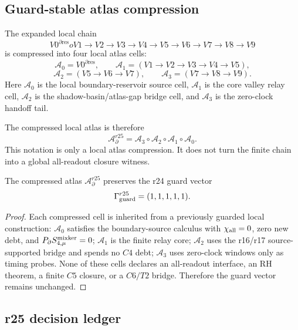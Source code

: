 \subsection{Guard-stable atlas compression}
\label{subsec:v470-r25-guard-stable-atlas-compression}

The expanded local chain
\[
V0^{\partial\mathrm{res}}	o V1\to V2\to V3\to V4\to V5\to V6\to V7\to V8\to V9
\]
is compressed into four local atlas cells:
\[
\mathcal A_0=V0^{\partial\mathrm{res}},
\qquad
\mathcal A_1=(V1\to V2\to V3\to V4\to V5),
\]
\[
\mathcal A_2=(V5\to V6\to V7),
\qquad
\mathcal A_3=(V7\to V8\to V9).
\]
Here \(\mathcal A_0\) is the local boundary-reservoir source cell,
\(\mathcal A_1\) is the core valley relay cell, \(\mathcal A_2\) is the
shadow-basin/atlas-gap bridge cell, and \(\mathcal A_3\) is the zero-clock
handoff tail.

The compressed local atlas is therefore
\[
\boxed{
\mathcal A_{\partial}^{r25}
=
\mathcal A_3\circ\mathcal A_2\circ\mathcal A_1\circ\mathcal A_0.
}
\]
This notation is only a local atlas compression.  It does not turn the finite
chain into a global all-readout closure witness.

\begin{lemma}
\label{lem:v470-r25-guard-stable-compression}
The compressed atlas \(\mathcal A_{\partial}^{r25}\) preserves the r24 guard
vector
\[
\Gamma_{\rm guard}^{r25}=(1,1,1,1,1).
\]
\end{lemma}

\begin{proof}
Each compressed cell is inherited from a previously guarded local construction:
\(\mathcal A_0\) satisfies the boundary-source calculus with
\(\chi_{\rm all}=0\), zero new debt, and \(P_{\partial}S_{4,\mu}^{\rm mixker}=0\);
\(\mathcal A_1\) is the finite relay core; \(\mathcal A_2\) uses the r16/r17
source-supported bridge and spends no \(C4\) debt; \(\mathcal A_3\) uses
zero-clock windows only as timing probes.  None of these cells declares an
all-readout interface, an RH theorem, a finite \(C5\) closure, or a \(C6/T2\)
bridge.  Therefore the guard vector remains unchanged.
\end{proof}

\subsection{r25 decision ledger}
\label{subsec:v470-r25-decision-ledger}

